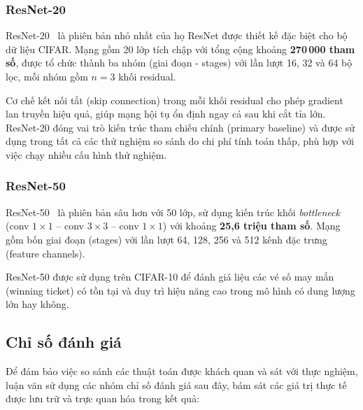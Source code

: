        \subsubsection{ResNet-20}
        \label{subsec:resnet20}
        
        ResNet-20~\cite{he2016deep} là phiên bản nhỏ nhất của họ ResNet được thiết kế
        đặc biệt cho bộ dữ liệu CIFAR.
        Mạng gồm 20 lớp tích chập với tổng cộng khoảng \textbf{270\,000 tham số},
        được tổ chức thành ba nhóm (giai đoạn - stages) với lần lượt 16, 32 và 64 bộ lọc,
        mỗi nhóm gồm $n=3$ khối residual.
        
        Cơ chế kết nối tắt (skip connection) trong mỗi khối residual cho phép
        gradient lan truyền hiệu quả, giúp mạng hội tụ ổn định ngay cả sau khi
        cắt tỉa lớn.
        ResNet-20 đóng vai trò kiến trúc tham chiếu chính (primary baseline) và
        được sử dụng trong tất cả các thử nghiệm so sánh do chi phí tính toán thấp,
        phù hợp với việc chạy nhiều cấu hình thử nghiệm.
        
        \subsubsection{ResNet-50}
        \label{subsec:resnet50}
        
        ResNet-50~\cite{he2016deep} là phiên bản sâu hơn với 50 lớp, sử dụng
        kiến trúc khối \textit{bottleneck} (conv $1\times1$ -- conv $3\times3$ -- conv $1\times1$)
        với khoảng \textbf{25,6 triệu tham số}.
        Mạng gồm bốn giai đoạn (stages) với lần lượt 64, 128, 256 và 512 kênh đặc trưng
        (feature channels).
        
        ResNet-50 được sử dụng trên CIFAR-10 để đánh giá liệu các vé số may mắn (winning ticket) có tồn tại và duy trì hiệu năng cao trong mô hình có dung lượng lớn
        hay không.

        \subsection{Chỉ số đánh giá}
        \label{sec:metrics}
    
        Để đảm bảo việc so sánh các thuật toán \pruning được khách quan và sát với thực nghiệm, luận văn sử dụng các nhóm chỉ số đánh giá sau đây, bám sát các giá trị thực tế được lưu trữ và trực quan hóa trong kết quả:

